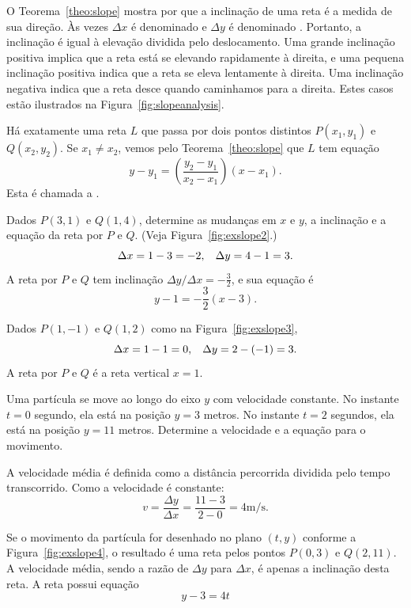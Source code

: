 O Teorema~\ref{theo:slope} mostra por que a inclinação de uma
reta é a medida de sua direção. Às vezes $\Delta x$ é denominado
 e $\Delta y$ é denominado
. Portanto, a inclinação é igual à elevação
dividida pelo deslocamento. Uma grande inclinação positiva
implica que a reta está se elevando rapidamente à direita,
e uma pequena inclinação positiva indica que a reta se eleva
lentamente à direita. Uma inclinação negativa indica que a
reta desce quando caminhamos para a direita. Estes casos estão
ilustrados na Figura~\ref{fig:slopeanalysis}.


Há exatamente uma reta $L$ que passa por dois pontos distintos
$P(x_1,y_1)$ e $Q(x_2, y_2)$. Se $x_1 \ne x_2$, vemos pelo
Teorema~\ref{theo:slope} que $L$ tem equação
\[
  y - y_1 = \left( \frac{y_2 - y_1}{x_2 - x_1} \right) (x - x_1).
\]
Esta é chamada a .

\begin{example}
Dados $P(3,1)$ e $Q(1,4)$, determine as mudanças em $x$ e $y$,
a inclinação e a equação da reta por $P$ e $Q$. (Veja
Figura~\ref{fig:exslope2}.)
\[
  \Delta x = 1 - 3 = -2, \hspace{2ex} \Delta y = 4 - 1 = 3.
\]
A reta por $P$ e $Q$ tem inclinação $\Delta y / \Delta x = -\frac{3}{2}$,
e sua equação é
\[
  y - 1 = -\frac{3}{2}(x-3).
\]
\end{example}


\begin{example}
Dados $P(1,-1)$ e $Q(1,2)$ como na Figura~\ref{fig:exslope3},
\[
  \Delta x = 1 - 1 = 0, \hspace{2ex} \Delta y = 2 - (-1) = 3.
\]
A reta por $P$ e $Q$ é a reta vertical $x = 1$.
\end{example}


\begin{example}
Uma partícula se move ao longo do eixo $y$ com velocidade
constante. No instante $t=0$ segundo, ela está na posição
$y = 3$ metros. No instante $t = 2$ segundos, ela está na
posição $y = 11$ metros. Determine a velocidade e a
equação para o movimento.

A velocidade média é definida como a distância percorrida dividida
pelo tempo transcorrido. Como a velocidade é constante:
\[
  v = \frac{\Delta y}{\Delta x} = \frac{11-3}{2-0} = 4 \text{m/s}.
\]

Se o movimento da partícula for desenhado no plano $(t,y)$
conforme a Figura~\ref{fig:exslope4}, o resultado é uma reta
pelos pontos $P(0,3)$ e $Q(2,11)$. A velocidade média,
sendo a razão de $\Delta y$ para $\Delta x$, é apenas a
inclinação desta reta. A reta possui equação
\[
  y - 3 = 4t
\]
\end{example}

